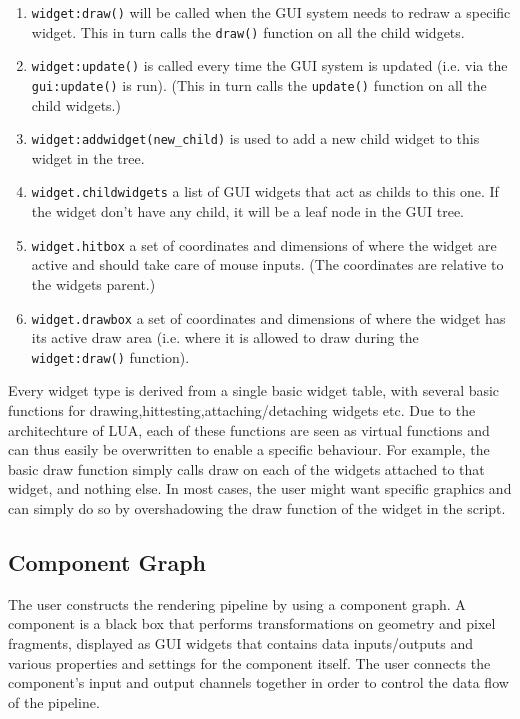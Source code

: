 \begin{enumerate}
  \item \texttt{widget:draw()} will be called when the GUI system needs to redraw a specific widget. This in turn calls the \texttt{draw()} function on all the child widgets.
  \item \texttt{widget:update()} is called every time the GUI system is updated (i.e. via the \texttt{gui:update()} is run). (This in turn calls the \texttt{update()} function on all the child widgets.)
  \item \texttt{widget:addwidget(new\_child)} is used to add a new child widget to this widget in the tree.
  \item \texttt{widget.childwidgets} a list of GUI widgets that act as childs to this one. If the widget don't have any child, it will be a leaf node in the GUI tree.
  \item \texttt{widget.hitbox} a set of coordinates and dimensions of where the widget are active and should take care of mouse inputs. (The coordinates are relative to the widgets parent.)
  \item \texttt{widget.drawbox} a set of coordinates and dimensions of where the widget has its active draw area (i.e. where it is allowed to draw during the \texttt{widget:draw()} function).
\end{enumerate}

Every widget type is derived from a single basic widget table, with several basic functions for drawing,hittesting,attaching/detaching widgets etc. Due to the architechture of LUA, each of these functions are seen as virtual functions and can thus easily be overwritten to enable a specific behaviour. For example, the basic draw function simply calls draw on each of the widgets attached to that widget, and nothing else. In most cases, the user might want specific graphics and can simply do so by overshadowing the draw function of the widget in the script. 

\subsection{Component Graph}
The user constructs the rendering pipeline by using a component graph. A component is a black box that performs transformations on geometry and pixel fragments, displayed as GUI widgets that contains data inputs/outputs and various properties and settings for the component itself. The user connects the component’s input and output channels together in order to control the data flow of the pipeline. 

